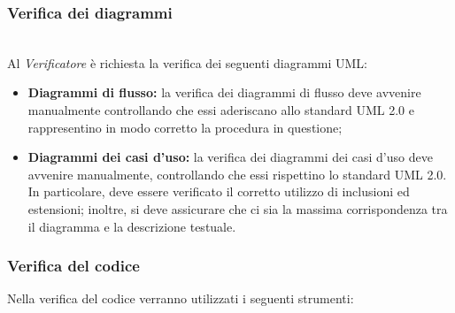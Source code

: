 \subsubsection{Verifica dei diagrammi}\mbox{}\\
\label{verifica_diagrammi}
Al \emph{Verificatore} è richiesta la verifica dei seguenti diagrammi UML\glossario{}:
\begin{itemize}
\item \textbf{Diagrammi di flusso:} la verifica dei diagrammi di flusso deve avvenire manualmente controllando che essi aderiscano allo standard UML\glossario{} 2.0 e rappresentino in modo corretto la procedura in questione;
\item \textbf{Diagrammi dei casi d'uso:} la verifica dei diagrammi dei casi d'uso deve avvenire manualmente, controllando che essi rispettino lo standard UML\glossario{} 2.0. In particolare, deve essere verificato il corretto utilizzo di inclusioni ed estensioni; inoltre, si deve assicurare che ci sia la massima corrispondenza tra il diagramma e la descrizione testuale.
\end{itemize}

\subsubsection{Verifica del codice}
\label{verifica_codice}
Nella verifica del codice verranno utilizzati i seguenti strumenti:

